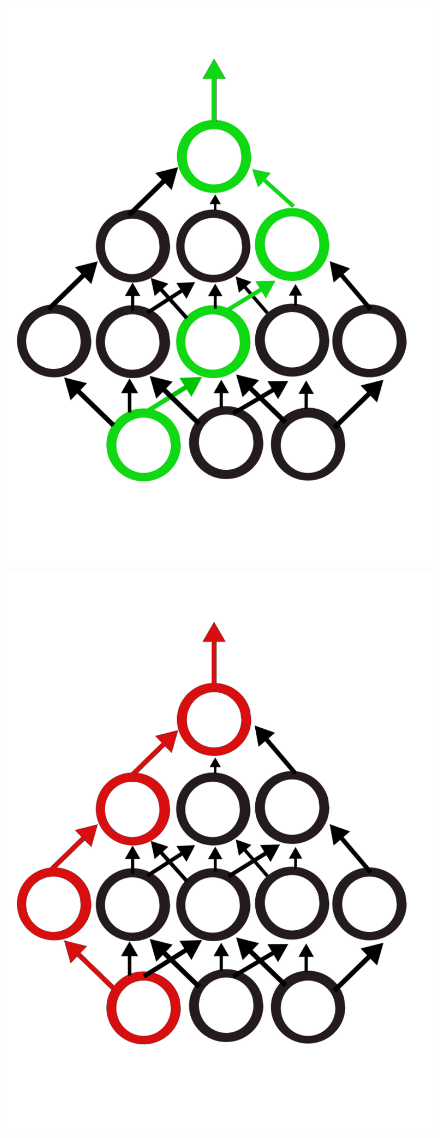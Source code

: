 \begin{figure}[!htb]
  \includegraphics[width=\linewidth]{./Images/Chapter06/mlp_ticket_3.pdf}
\endminipage\hfill
{}%
  \includegraphics[width=\linewidth]{./Images/Chapter06/random_ticket_1.pdf}

\end{figure}
